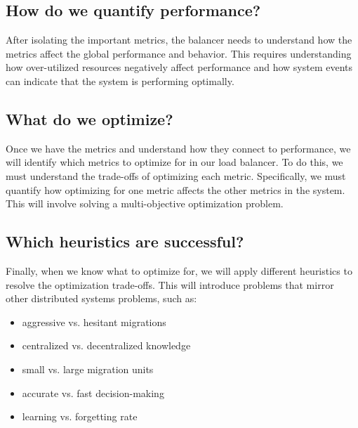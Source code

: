\subsection*{How do we quantify performance?}

After isolating the important metrics, the balancer needs to understand how the
metrics affect the global performance and behavior. This requires understanding
how over-utilized resources negatively affect performance and how system events
can indicate that the system is performing optimally.

\subsection*{What do we optimize?}

Once we have the metrics and understand how they connect to performance, we
will identify which metrics to optimize for in our load balancer. To do this,
we must understand the trade-offs of optimizing each metric. Specifically, we
must quantify how optimizing for one metric affects the other metrics in the
system. This will involve solving a multi-objective optimization problem. 

\subsection*{Which heuristics are successful?}

Finally, when we know what to optimize for, we will apply different heuristics
to resolve the optimization trade-offs. This will introduce problems that
mirror other distributed systems problems, such as:

\begin{itemize}
	\item aggressive vs. hesitant migrations	
	\item centralized vs. decentralized knowledge
	\item small vs. large migration units
	\item accurate vs. fast decision-making
	\item learning vs. forgetting rate
\end{itemize}
